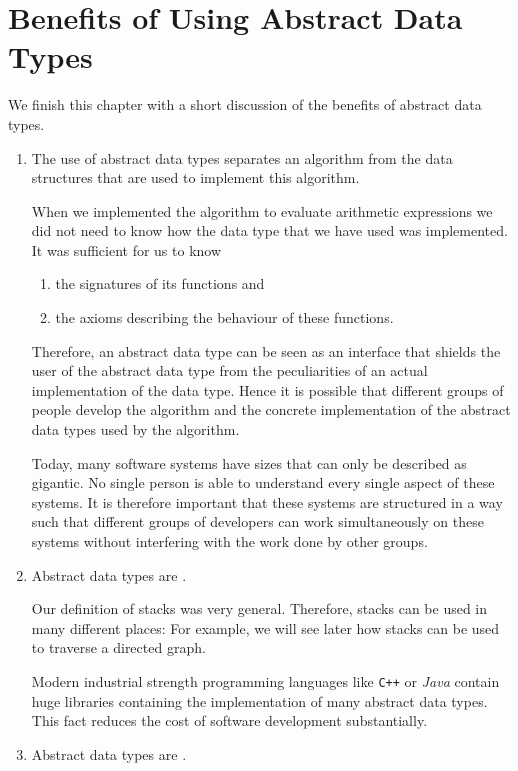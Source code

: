 \section[Benefits of Abstract Data Types]{Benefits of Using Abstract Data Types}
We finish this chapter with a short discussion of the benefits of abstract data types.
 \begin{enumerate}
 \item The use of abstract data types separates an algorithm from the data structures that
       are used to implement this algorithm.

       When we implemented the algorithm to evaluate arithmetic expressions we did not need to know
       how the data type  that we have used was implemented.  It was sufficient for us to know 
       \begin{enumerate}
       \item the signatures of its functions and
       \item the axioms describing the behaviour of these functions.
       \end{enumerate}
       Therefore, an abstract data type can be seen as an interface that shields the user of the
       abstract data type from the peculiarities of an actual implementation of the data type.
       Hence it is possible that different groups of people develop the algorithm and the
       concrete implementation of the abstract data types used by the algorithm.  

       Today, many software systems have sizes that can only be described as gigantic.  No single
       person is able to understand every single aspect of these systems.  It is therefore important
       that these systems are structured in a way such that different groups of developers can work
       simultaneously on these systems without interfering with the work done by other groups.
 \item Abstract data types are .

       Our definition of stacks was very general.  Therefore, stacks can be used in many different
       places:  For example, we will see later how stacks can be used to traverse a directed graph.

       Modern industrial strength programming languages like \texttt{C++} or \textsl{Java} contain
       huge libraries containing the implementation of many abstract data types.  This fact reduces
       the cost of software development substantially.     
 \item Abstract data types are .


\end{enumerate}
